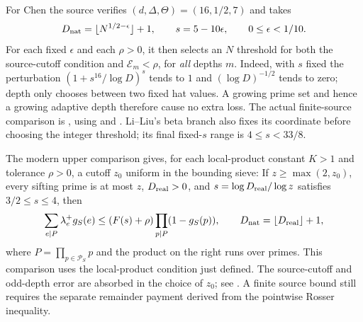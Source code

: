 For Chen the source verifies $(d,\Delta,\Theta)=(16,1/2,7)$ and takes
\[
 D_{\rm nat}=\lfloor N^{1/2-\epsilon}\rfloor+1,
 \qquad s=5-10\epsilon,\qquad 0\le\epsilon<1/10.
\]
For each fixed $\epsilon$ and each $\rho>0$, it then selects an $N$ threshold
for both the source-cutoff condition and $\mathcal E_m<\rho$, for \emph{all}
depths $m$. Indeed, with $s$ fixed the perturbation
$(1+s^{16}/\log D)^s$ tends to $1$ and $(\log D)^{-1/2}$ tends to zero;
depth only chooses between two fixed hat values. A growing prime set and
hence a growing adaptive depth therefore cause no extra loss.
The actual finite-source comparison is
,
using 
and .
Li--Liu's beta branch also fixes its coordinate before choosing the integer
threshold; its final fixed-$s$ range is $4\le s<33/8$.

The modern upper comparison gives, for each local-product constant $K>1$
and tolerance $\rho>0$, a cutoff $z_0$ uniform in the bounding sieve:
If $z\ge\max(2,z_0)$, every sifting prime is at most $z$,
$D_{\rm real}>0$, and $s=\log D_{\rm real}/\log z$ satisfies
$3/2\le s\le4$, then
\[
 \sum_{e\mid P}\lambda_e^+g_S(e)
 \le (F(s)+\rho)\prod_{p\mid P}(1-g_S(p)),
 \qquad D_{\rm nat}=\lfloor D_{\rm real}\rfloor+1,
\]
where $P=\prod_{p\in\mathcal P_S}p$ and the product on the right runs over
primes. This comparison uses the local-product condition just defined.
The source-cutoff and odd-depth error are absorbed in the choice of $z_0$;
see .
A finite source bound still requires the separate remainder payment derived
from the pointwise Rosser inequality.


